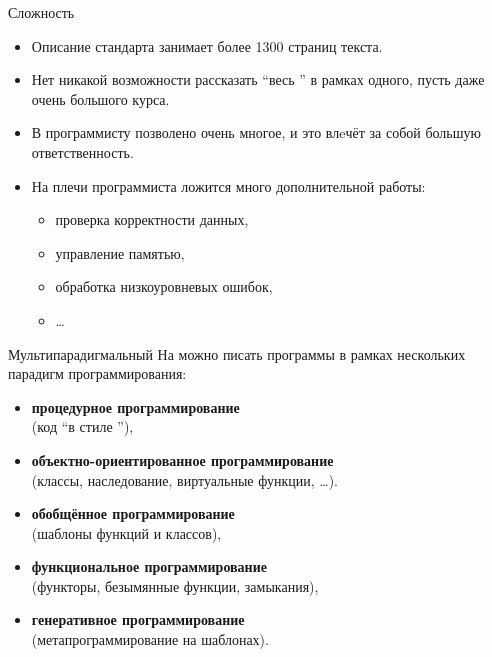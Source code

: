 \documentclass[aspectration=1610,t]{beamer}
\begin{document}
\begin{frame}[fragile]{Сложность}
    \begin{itemize}
        \item Описание стандарта занимает более 1300 страниц текста.
        \item Нет никакой возможности рассказать ``весь \langcpp'' в рамках
            одного, пусть даже очень большого курса.
        \item В \langcpp программисту позволено очень многое, и это влeчёт за
            собой большую ответственность.
        \item На плечи программиста ложится много дополнительной работы:
            \begin{itemize}
                \item проверка корректности данных, 
                \item управление памятью, 
                \item обработка низкоуровневых ошибок,
                \item \dots
            \end{itemize}
    \end{itemize}
\end{frame}

\begin{frame}{Мультипарадигмальный}
    На \langcpp можно писать программы в рамках нескольких парадигм программирования:
    \begin{itemize}
        \item {\bf процедурное программирование}\\
            (код ``в стиле \langc''),
        \item {\bf объектно-ориентированное программирование}\\
            (классы, наследование, виртуальные функции, \dots).
        \item {\bf обобщённое программирование}\\
            (шаблоны функций и классов),
        \item {\bf функциональное программирование}\\
            (функторы, безымянные функции, замыкания),
        \item {\bf генеративное программирование}\\
            (метапрограммирование на шаблонах).
    \end{itemize}
\end{frame}
\end{document}
